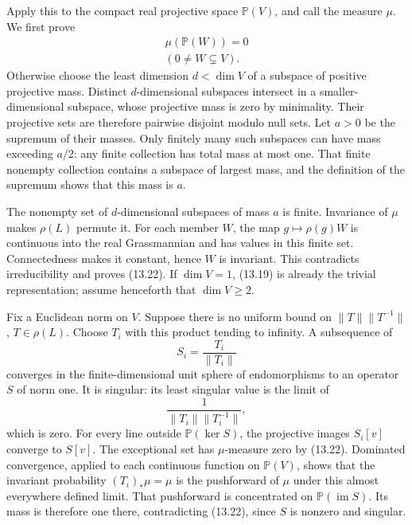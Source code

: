 \documentclass[
  11pt,
]{article}
\begin{document}
Apply this to the compact real projective space \(\mathbb P(V)\), and
call the measure \(\mu\). We first prove \[
\begin{gathered}
\mu(\mathbb P(W))=0\\
(0\ne W\subsetneq V).
\end{gathered}
\tag{13.22}
\] Otherwise choose the least dimension \(d<\dim V\) of a subspace of
positive projective mass. Distinct \(d\)-dimensional subspaces intersect
in a smaller-dimensional subspace, whose projective mass is zero by
minimality. Their projective sets are therefore pairwise disjoint modulo
null sets. Let \(a>0\) be the supremum of their masses. Only finitely
many such subspaces can have mass exceeding \(a/2\): any finite
collection has total mass at most one. That finite nonempty collection
contains a subspace of largest mass, and the definition of the supremum
shows that this mass is \(a\).

The nonempty set of \(d\)-dimensional subspaces of mass \(a\) is finite.
Invariance of \(\mu\) makes \(\rho(L)\) permute it. For each member
\(W\), the map \(g\mapsto\rho(g)W\) is continuous into the real
Grassmannian and has values in this finite set. Connectedness makes it
constant, hence \(W\) is invariant. This contradicts irreducibility and
proves (13.22). If \(\dim V=1\), (13.19) is already the trivial
representation; assume henceforth that \(\dim V\ge2\).

Fix a Euclidean norm on \(V\). Suppose there is no uniform bound on
\(\|T\|\|T^{-1}\|\), \(T\in\rho(L)\). Choose \(T_i\) with this product
tending to infinity. A subsequence of \[
S_i=\frac{T_i}{\|T_i\|}
\tag{13.23}
\] converges in the finite-dimensional unit sphere of endomorphisms to
an operator \(S\) of norm one. It is singular: its least singular value
is the limit of \[
\frac{1}{\|T_i\|\|T_i^{-1}\|},
\tag{13.24}
\] which is zero. For every line outside \(\mathbb P(\ker S)\), the
projective images \(S_i[v]\) converge to \(S[v]\). The exceptional set
has \(\mu\)-measure zero by (13.22). Dominated convergence, applied to
each continuous function on \(\mathbb P(V)\), shows that the invariant
probability \((T_i)_*\mu=\mu\) is the pushforward of \(\mu\) under this
almost everywhere defined limit. That pushforward is concentrated on
\(\mathbb P(\operatorname{im}S)\). Its mass is therefore one there,
contradicting (13.22), since \(S\) is nonzero and singular.
\end{document}

